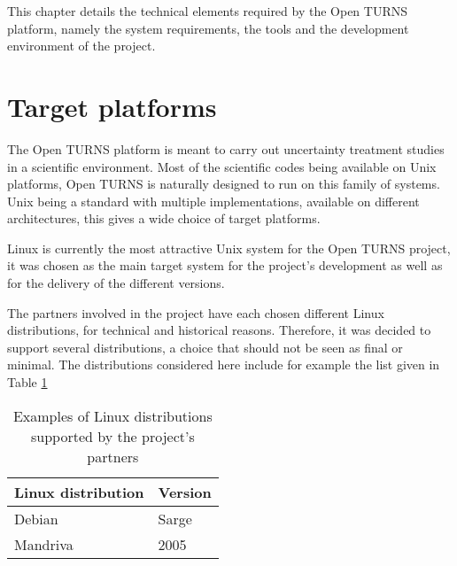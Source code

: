 
This chapter details the technical elements required by the Open TURNS platform, namely the system requirements, the tools and the development environment of the project.

\section{Target platforms}

The Open TURNS platform is meant to carry out uncertainty treatment studies in a scientific environment. Most of the scientific codes being available on Unix platforms, Open TURNS is naturally designed to run on this family of systems. Unix being a standard with multiple implementations, available on different architectures, this gives a wide choice of target platforms.

Linux is currently the most attractive Unix system for the Open TURNS project, it was chosen as the main target system for the project's development as well as for the delivery of the different versions.

The partners involved in the project have each chosen different Linux distributions, for technical and historical reasons. Therefore, it was decided to support several distributions, a choice that should not be seen as final or minimal. The distributions considered here include for example the list given in Table \ref{linux}

\begin{center}
  \begin{table}[h]
    \caption{\label{linux}Examples of Linux distributions supported by the project's partners}
    \begin{center}
      \begin{tabular}{|l|l|}
        \hline
        \textbf{Linux distribution} & \textbf{Version} \\
        \hline \hline
        Debian & Sarge \\
        Mandriva & 2005 \\
        \hline
      \end{tabular}
    \end{center}
  \end{table}
\end{center}

